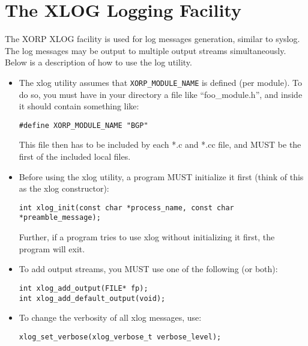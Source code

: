 \documentclass[11pt]{article}
\begin{document}
\newpage

\section{The XLOG Logging Facility}
\label{xlog}

The XORP XLOG facility is used for log messages generation, similar to
syslog. The log messages may be output to multiple output streams
simultaneously. Below is a description of how to use the log utility.

\begin{itemize}

  \item The xlog utility assumes that \verb=XORP_MODULE_NAME= is defined
  (per module). To do so, you must have in your directory a file like
  ``foo\_module.h'', and inside it should contain something like:

\begin{verbatim}
#define XORP_MODULE_NAME "BGP"
\end{verbatim}

  This file then has to be included by each *.c and *.cc file,
  and MUST be the first of the included local files.

  \item Before using the xlog utility, a program MUST initialize it
  first (think of this as the xlog constructor):

\begin{verbatim}
int xlog_init(const char *process_name, const char *preamble_message);
\end{verbatim}

  Further, if a program tries to use xlog without initializing it
  first, the program will exit.

  \item To add output streams, you MUST use one of the following (or both):

\begin{verbatim}
int xlog_add_output(FILE* fp);
int xlog_add_default_output(void);
\end{verbatim}

  \item To change the verbosity of all xlog messages, use:

\begin{verbatim}
xlog_set_verbose(xlog_verbose_t verbose_level);
\end{verbatim}


\end{itemize}
\end{document}
